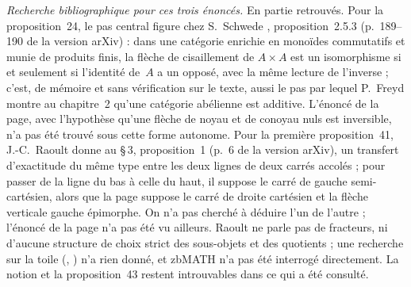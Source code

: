 \noindent\emph{Recherche bibliographique pour ces trois énoncés.} En partie retrouvés. Pour la proposition~24, le pas central figure chez
S.~Schwede \cite{schwede2018}, proposition~2.5.3 (p.~189--190 de la version arXiv) : dans une
catégorie enrichie en monoïdes commutatifs et munie de produits finis, la flèche de
cisaillement de $A \times A$ est un isomorphisme si et seulement si l'identité de~$A$ a un
opposé, avec la même lecture de l'inverse ; c'est, de mémoire et sans vérification sur le
texte, aussi le pas par lequel P.~Freyd \cite{freyd1964} montre au chapitre~2 qu'une
catégorie abélienne est additive. L'énoncé de la page, avec l'hypothèse qu'une flèche
de noyau et de conoyau nuls est inversible, n'a pas été trouvé sous cette forme autonome.
Pour la première proposition~41, J.-C.~Raoult \cite{raoult2019} donne au \S\,3, proposition~1
(p.~6 de la version arXiv), un transfert d'exactitude du même type entre les deux lignes de
deux carrés accolés ; pour passer de la ligne du bas à celle du haut, il suppose le carré de
gauche semi-cartésien, alors que la page suppose le carré de droite cartésien et la flèche
verticale gauche épimorphe. On n'a pas cherché à déduire l'un de l'autre ; l'énoncé de la page
n'a pas été vu ailleurs. Raoult ne parle pas de fracteurs, ni d'aucune structure de choix
strict des sous-objets et des quotients ; une recherche sur la toile (, ) n'a rien donné, et zbMATH n'a pas été interrogé directement. La
notion et la proposition~43 restent introuvables dans ce qui a été consulté.

